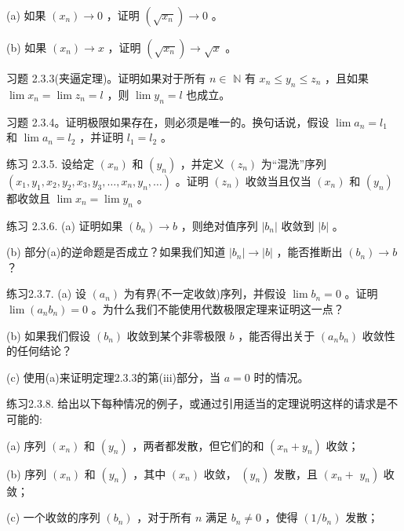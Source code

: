 (a) 如果 \(\left( {x}_{n}\right)  \rightarrow  0\) ，证明 \(\left( \sqrt{{x}_{n}}\right)  \rightarrow  0\) 。

(b) 如果 \(\left( {x}_{n}\right)  \rightarrow  x\) ，证明 \(\left( \sqrt{{x}_{n}}\right)  \rightarrow  \sqrt{x}\) 。

习题 2.3.3(夹逼定理)。证明如果对于所有 \(n \in\)  \(\mathbb{N}\) 有 \({x}_{n} \leq  {y}_{n} \leq  {z}_{n}\) ，且如果 \(\lim {x}_{n} = \lim {z}_{n} = l\) ，则 \(\lim {y}_{n} = l\) 也成立。

习题 2.3.4。证明极限如果存在，则必须是唯一的。换句话说，假设 \(\lim {a}_{n} = {l}_{1}\) 和 \(\lim {a}_{n} = {l}_{2}\) ，并证明 \({l}_{1} = {l}_{2}\) 。

练习 2.3.5. 设给定 \(\left( {x}_{n}\right)\) 和 \(\left( {y}_{n}\right)\) ，并定义 \(\left( {z}_{n}\right)\) 为“混洗”序列 \(\left( {{x}_{1},{y}_{1},{x}_{2},{y}_{2},{x}_{3},{y}_{3},\ldots ,{x}_{n},{y}_{n},\ldots }\right)\) 。证明 \(\left( {z}_{n}\right)\) 收敛当且仅当 \(\left( {x}_{n}\right)\) 和 \(\left( {y}_{n}\right)\) 都收敛且 \(\lim {x}_{n} = \lim {y}_{n}\) 。

练习 2.3.6. (a) 证明如果 \(\left( {b}_{n}\right)  \rightarrow  b\) ，则绝对值序列 \(\left| {b}_{n}\right|\) 收敛到 \(\left| b\right|\) 。

(b) 部分(a)的逆命题是否成立？如果我们知道 \(\left| {b}_{n}\right|  \rightarrow  \left| b\right|\) ，能否推断出 \(\left( {b}_{n}\right)  \rightarrow  b\) ？

练习2.3.7. (a) 设 \(\left( {a}_{n}\right)\) 为有界(不一定收敛)序列，并假设 \(\lim {b}_{n} = 0\) 。证明 \(\lim \left( {{a}_{n}{b}_{n}}\right)  = 0\) 。为什么我们不能使用代数极限定理来证明这一点？

(b) 如果我们假设 \(\left( {b}_{n}\right)\) 收敛到某个非零极限 \(b\) ，能否得出关于 \(\left( {{a}_{n}{b}_{n}}\right)\) 收敛性的任何结论？

(c) 使用(a)来证明定理2.3.3的第(iii)部分，当 \(a = 0\) 时的情况。

练习2.3.8. 给出以下每种情况的例子，或通过引用适当的定理说明这样的请求是不可能的:

(a) 序列 \(\left( {x}_{n}\right)\) 和 \(\left( {y}_{n}\right)\) ，两者都发散，但它们的和 \(\left( {{x}_{n} + {y}_{n}}\right)\) 收敛；

(b) 序列 \(\left( {x}_{n}\right)\) 和 \(\left( {y}_{n}\right)\) ，其中 \(\left( {x}_{n}\right)\) 收敛， \(\left( {y}_{n}\right)\) 发散，且 \(\left( {{x}_{n} + }\right.\)  \(\left. {y}_{n}\right)\) 收敛；

(c) 一个收敛的序列 \(\left( {b}_{n}\right)\) ，对于所有 \(n\) 满足 \({b}_{n} \neq  0\) ，使得 \(\left( {1/{b}_{n}}\right)\) 发散；

